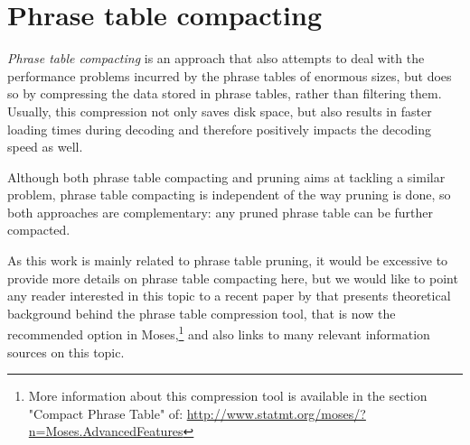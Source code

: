 \section{Phrase table compacting}

\emph{Phrase table compacting} is an approach that also attempts to deal with the performance
problems incurred by the phrase tables of enormous sizes, but does so by compressing the data
stored in phrase tables, rather than filtering them.
Usually, this compression not only saves disk space, but also results in faster loading times
during decoding and therefore positively impacts the decoding speed as well.

Although both phrase table compacting and pruning aims at tackling a similar problem, phrase
table compacting is independent of the way pruning is done, so both approaches are complementary:
any pruned phrase table can be further compacted.

As this work is mainly related to phrase table pruning, it would be excessive to provide more
details on phrase table compacting here, but we would like to point any reader interested in this
topic to a recent paper by \citet{junczys:compact} that presents theoretical background behind
the phrase table compression tool, that is now the recommended option in Moses,\footnote{More
information about this compression tool is available in the section "Compact Phrase Table" of:
\url{http://www.statmt.org/moses/?n=Moses.AdvancedFeatures}} and also links to many relevant
information sources on this topic.
